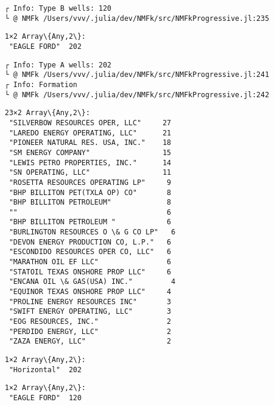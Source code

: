 \documentclass[11pt]{article}
\begin{document}
    \begin{Verbatim}[commandchars=\\\{\}]
┌ Info: Type B wells: 120
└ @ NMFk /Users/vvv/.julia/dev/NMFk/src/NMFkProgressive.jl:235
    \end{Verbatim}

    
    \begin{Verbatim}[commandchars=\\\{\}]
1×2 Array\{Any,2\}:
 "EAGLE FORD"  202
    \end{Verbatim}

    
    \begin{Verbatim}[commandchars=\\\{\}]
┌ Info: Type A wells: 202
└ @ NMFk /Users/vvv/.julia/dev/NMFk/src/NMFkProgressive.jl:241
┌ Info: Formation
└ @ NMFk /Users/vvv/.julia/dev/NMFk/src/NMFkProgressive.jl:242
    \end{Verbatim}

    
    \begin{Verbatim}[commandchars=\\\{\}]
23×2 Array\{Any,2\}:
 "SILVERBOW RESOURCES OPER, LLC"     27
 "LAREDO ENERGY OPERATING, LLC"      21
 "PIONEER NATURAL RES. USA, INC."    18
 "SM ENERGY COMPANY"                 15
 "LEWIS PETRO PROPERTIES, INC."      14
 "SN OPERATING, LLC"                 11
 "ROSETTA RESOURCES OPERATING LP"     9
 "BHP BILLITON PET(TXLA OP) CO"       8
 "BHP BILLITON PETROLEUM"             8
 ""                                   6
 "BHP BILLITON PETROLEUM "            6
 "BURLINGTON RESOURCES O \& G CO LP"   6
 "DEVON ENERGY PRODUCTION CO, L.P."   6
 "ESCONDIDO RESOURCES OPER CO, LLC"   6
 "MARATHON OIL EF LLC"                6
 "STATOIL TEXAS ONSHORE PROP LLC"     6
 "ENCANA OIL \& GAS(USA) INC."         4
 "EQUINOR TEXAS ONSHORE PROP LLC"     4
 "PROLINE ENERGY RESOURCES INC"       3
 "SWIFT ENERGY OPERATING, LLC"        3
 "EOG RESOURCES, INC."                2
 "PERDIDO ENERGY, LLC"                2
 "ZAZA ENERGY, LLC"                   2
    \end{Verbatim}

    
    
    \begin{Verbatim}[commandchars=\\\{\}]
1×2 Array\{Any,2\}:
 "Horizontal"  202
    \end{Verbatim}

    
    
    \begin{Verbatim}[commandchars=\\\{\}]
1×2 Array\{Any,2\}:
 "EAGLE FORD"  120
    \end{Verbatim}
\end{document}
